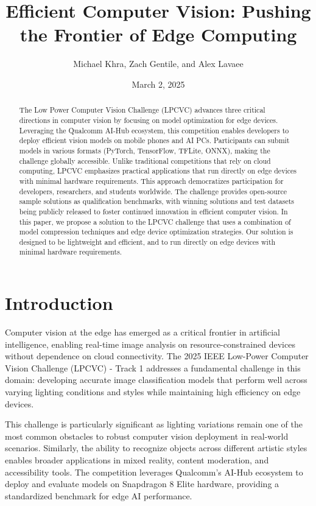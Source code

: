 \documentclass[11pt, oneside]{article}   	%
\title{Efficient Computer Vision: Pushing the Frontier of Edge Computing}
\author{Michael Khra, Zach Gentile, and Alex Lavaee}
\date{March 2, 2025}
\begin{document}
\maketitle

\begin{abstract}
	The Low Power Computer Vision Challenge (LPCVC) advances three critical directions in computer vision by focusing on model optimization for edge devices. Leveraging the Qualcomm AI-Hub ecosystem, this competition enables developers to deploy efficient vision models on mobile phones and AI PCs. Participants can submit models in various formats (PyTorch, TensorFlow, TFLite, ONNX), making the challenge globally accessible.
	Unlike traditional competitions that rely on cloud computing, LPCVC emphasizes practical applications that run directly on edge devices with minimal hardware requirements. This approach democratizes participation for developers, researchers, and students worldwide. The challenge provides open-source sample solutions as qualification benchmarks, with winning solutions and test datasets being publicly released to foster continued innovation in efficient computer vision.
	In this paper, we propose a solution to the LPCVC challenge that uses a combination of model compression techniques and edge device optimization strategies. Our solution is designed to be lightweight and efficient, and to run directly on edge devices with minimal hardware requirements.
\end{abstract}

\section*{Introduction}

Computer vision at the edge has emerged as a critical frontier in artificial intelligence, enabling real-time image analysis on resource-constrained devices without dependence on cloud connectivity. The 2025 IEEE Low-Power Computer Vision Challenge (LPCVC) - Track 1 addresses a fundamental challenge in this domain: developing accurate image classification models that perform well across varying lighting conditions and styles while maintaining high efficiency on edge devices.

This challenge is particularly significant as lighting variations remain one of the most common obstacles to robust computer vision deployment in real-world scenarios. Similarly, the ability to recognize objects across different artistic styles enables broader applications in mixed reality, content moderation, and accessibility tools. The competition leverages Qualcomm's AI-Hub ecosystem to deploy and evaluate models on Snapdragon 8 Elite hardware, providing a standardized benchmark for edge AI performance.
\end{document}

